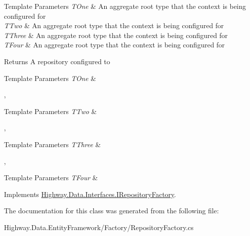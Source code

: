 \begin{DoxyTemplParams}{Template Parameters}
{\em T\-One} & An aggregate root type that the context is being configured for\\
\hline
{\em T\-Two} & An aggregate root type that the context is being configured for\\
\hline
{\em T\-Three} & An aggregate root type that the context is being configured for\\
\hline
{\em T\-Four} & An aggregate root type that the context is being configured for\\
\hline
\end{DoxyTemplParams}
\begin{DoxyReturn}{Returns}
A repository configured to 
\begin{DoxyTemplParams}{Template Parameters}
{\em T\-One} & \\
\hline
\end{DoxyTemplParams}
,
\begin{DoxyTemplParams}{Template Parameters}
{\em T\-Two} & \\
\hline
\end{DoxyTemplParams}
,
\begin{DoxyTemplParams}{Template Parameters}
{\em T\-Three} & \\
\hline
\end{DoxyTemplParams}
,
\begin{DoxyTemplParams}{Template Parameters}
{\em T\-Four} & \\
\hline
\end{DoxyTemplParams}

\end{DoxyReturn}


Implements \hyperlink{interface_highway_1_1_data_1_1_interfaces_1_1_i_repository_factory_a41cfb8f0c6ee57071f92df68c7f5a7b9}{Highway.\-Data.\-Interfaces.\-I\-Repository\-Factory}.



The documentation for this class was generated from the following file\-:\begin{DoxyCompactItemize}
\item 
Highway.\-Data.\-Entity\-Framework/\-Factory/Repository\-Factory.\-cs\end{DoxyCompactItemize}
